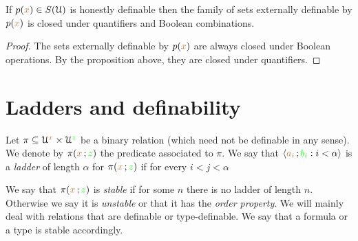 \begin{corollary}
If $p({\color{brown} x})\in S(\EuScript U)$ is honestly definable then the family of sets externally definable by $p({\color{brown} x})$ is closed under quantifiers and Boolean combinations.
\end{corollary}

\begin{proof}
The sets externally definable by $p({\color{brown} x})$ are always closed under Boolean operations.
By the proposition above, they are closed under quantifiers.
\end{proof}


\section{Ladders and definability}


Let $\pi\subseteq\EuScript U^{\color{brown} x}\times\EuScript U^{\color{green} z}$ be a binary relation (which need not be definable in any sense).
We denote by $\pi({\color{brown} x}\,;{\color{green} z})$ the predicate associated to $\pi$.
We say that $\langle{\color{brown}a_i}\,;{\color{green} b_i} : i<\alpha\rangle$ is a \emph{ladder\/} of length $\alpha$ for $\pi({\color{brown} x}\,;{\color{green} z})$ if for every $i<j<\alpha$


We say that $\pi({\color{brown} x}\,;{\color{green} z})$ is \emph{stable\/} if for some $n$ there is no ladder of length $n$.
Otherwise we say it is \emph{unstable} or that it has the \emph{order property}.
We will mainly deal with relations that are definable or type-definable.
We say that a formula or a type is stable accordingly.

